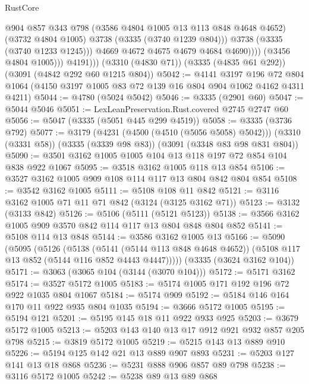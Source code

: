 \begin{lexlean}{RustCore}
\begin{coremodule}
                          @904
                          @857
                          @343
                          @798
                          (@3586 @4804 @1005 @13 @113 @848 @4648 @4652)
                          (@3732 @4804 @1005)
                          @3738
                          (@3335 (@3740 @1239 @804)))
                        @3738
                        (@3335 (@3740 @1233 @1245)))
                      @4669
                      @4672
                      @4675
                      @4679
                      @4684
                      @4690))))
              (@3456 @4804 @1005)))
          @4191)))
    (@3310 (@4830 @71))
    (@3335 (@4835 @61 @292))
    (@3091 (@4842 @292 @60 @1215 @804))
@5042 := @4141
    @3197
    @196
    @72
    @804
    @1064
    (@4150 @3197 @1005 @83 @72 @139 @16 @804 @904 @1062 @4162 @4311 @4211)
@5044 := @4780 (@5024 @5042)
@5046 := @3335 (@2901 @60)
@5047 := @5044 @5046
@5051 := LexLeanPreservation.Rust.covered @2745 @2747 @60
@5056 := @5047 (@3335 (@5051 @445 @299 @4519))
@5058 := @3335 (@3736 @792)
@5077 := @3179
    (@4231 (@4500 (@4510 (@5056 @5058) @5042)))
    (@3310 (@3331 @58))
    (@3335 (@3339 @98 @83))
    (@3091 (@3348 @83 @98 @831 @804))
@5090 := @3501 @3162 @1005 @1005 @104 @13 @118 @197 @72 @854 @104 @838 @922 @1067
@5095 := @3518 @3162 @1005 @118 @13 @854
@5106 := @3527 @3162 @1005 @909 @108 @114 @117 @13 @804 @842 @804 @854
@5108 := @3542 @3162 @1005
@5111 := @5108 @108 @11 @842
@5121 := @3116 @3162 @1005 @71 @11 @71 @842 (@3124 (@3125 @3162 @71))
@5123 := @3132 (@3133 @842)
@5126 := @5106 (@5111 (@5121 @5123))
@5138 := @3566 @3162 @1005 @909 @3570 @842 @114 @117 @13 @804 @848 @804 @852
@5141 := @5108 @114 @13 @848
@5144 := @3586 @3162 @1005 @13
@5166 := @5090
    (@5095
      (@5126
        (@5138
          (@5141 (@5144 @113 @848 @4648 @4652))
          (@5108 @117 @13 @852 (@5144 @116 @852 @4443 @4447)))))
    (@3335 (@3624 @3162 @104))
@5171 := @3063 (@3065 @104 (@3144 (@3070 @104)))
@5172 := @5171 @3162
@5174 := @3527 @5172 @1005
@5183 := @5174 @1005 @171 @192 @196 @72 @922 @1035 @804 @1067
@5184 := @5174 @909
@5192 := @5184 @146 @164 @170 @11 @922 @935 @804 @1035
@5194 := @3666 @5172 @1005
@5195 := @5194 @121
@5201 := @5195 @145 @18 @11 @922 @933 @925
@5203 := @3679 @5172 @1005
@5213 := @5203 @143 @140 @13 @17 @912 @921 @932 @857 @205 @798
@5215 := @3819 @5172 @1005
@5219 := @5215 @143 @13 @889 @910
@5226 := @5194 @125 @142 @21 @13 @889 @907 @893
@5231 := @5203 @127 @141 @13 @18 @868
@5236 := @5231 @888 @906 @857 @89 @798
@5238 := @3116 @5172 @1005
@5242 := @5238 @89 @13 @89 @868

\end{coremodule}
\end{lexlean}
